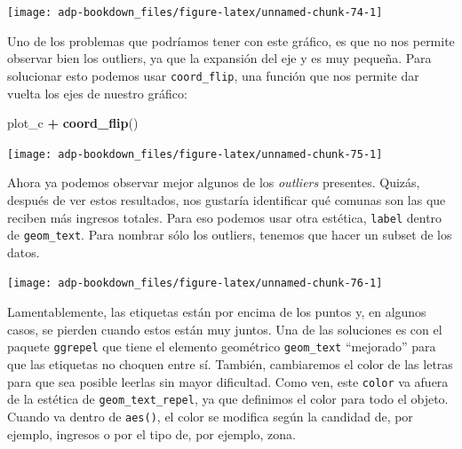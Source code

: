 \documentclass[]{book}
\newenvironment{Shaded}{\begin{snugshade}}{\end{snugshade}}
\newcommand{\DataTypeTok}[1]{\textcolor[rgb]{0.13,0.29,0.53}{#1}}
\newcommand{\DecValTok}[1]{\textcolor[rgb]{0.00,0.00,0.81}{#1}}
\newcommand{\KeywordTok}[1]{\textcolor[rgb]{0.13,0.29,0.53}{\textbf{#1}}}
\newcommand{\NormalTok}[1]{#1}
\newcommand{\OperatorTok}[1]{\textcolor[rgb]{0.81,0.36,0.00}{\textbf{#1}}}
\newcommand{\StringTok}[1]{\textcolor[rgb]{0.31,0.60,0.02}{#1}}
\begin{document}
\begin{center}\texttt{[image: adp-bookdown\_files/figure-latex/unnamed-chunk-74-1]} \end{center}

Uno de los problemas que podríamos tener con este gráfico, es que no nos
permite observar bien los outliers, ya que la expansión del eje y es muy
pequeña. Para solucionar esto podemos usar \texttt{coord\_flip}, una
función que nos permite dar vuelta los ejes de nuestro gráfico:

\begin{Shaded}
\begin{Highlighting}[]
\NormalTok{plot_c }\OperatorTok{+}\StringTok{ }
\StringTok{  }\KeywordTok{coord_flip}\NormalTok{() }
\end{Highlighting}
\end{Shaded}

\begin{center}\texttt{[image: adp-bookdown\_files/figure-latex/unnamed-chunk-75-1]} \end{center}

Ahora ya podemos observar mejor algunos de los \emph{outliers}
presentes. Quizás, después de ver estos resultados, nos gustaría
identificar qué comunas son las que reciben más ingresos totales. Para
eso podemos usar otra estética, \texttt{label} dentro de
\texttt{geom\_text}. Para nombrar sólo los outliers, tenemos que hacer
un subset de los datos.

\begin{Shaded}
\end{Shaded}

\begin{center}\texttt{[image: adp-bookdown\_files/figure-latex/unnamed-chunk-76-1]} \end{center}

Lamentablemente, las etiquetas están por encima de los puntos y, en
algunos casos, se pierden cuando estos están muy juntos. Una de las
soluciones es con el paquete \texttt{ggrepel} que tiene el elemento
geométrico \texttt{geom\_text} ``mejorado'' para que las etiquetas no
choquen entre sí. También, cambiaremos el color de las letras para que
sea posible leerlas sin mayor dificultad. Como ven, este \texttt{color}
va afuera de la estética de \texttt{geom\_text\_repel}, ya que definimos
el color para todo el objeto. Cuando va dentro de \texttt{aes()}, el
color se modifica según la candidad de, por ejemplo, ingresos o por el
tipo de, por ejemplo, zona.
\end{document}
